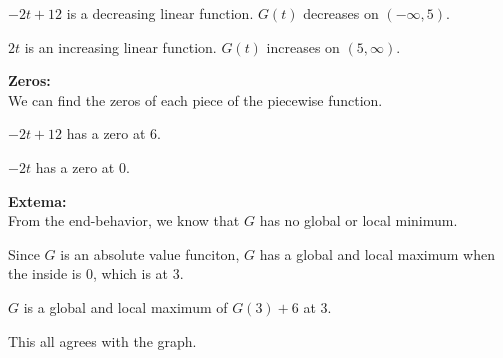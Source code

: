 \documentclass{ximera}
\begin{document}
\begin{exercise}
$-2 t + 12$ is a decreasing linear function.  $G(t)$ decreases on $(-\infty, 5)$.

$2 t$ is an increasing linear function.  $G(t)$ increases on $(5, \infty)$.





\textbf{\textcolor{blue!55!black}{Zeros:}}  \\


We can find the zeros of each piece of the piecewise function.




$-2 t + 12 $ has a zero at $6$.


$-2 t$ has a zero at $0$.





\textbf{\textcolor{blue!55!black}{Extema:}}  \\


From the end-behavior, we know that $G$ has no global or local minimum.


Since $G$ is an absolute value funciton, $G$ has a global and local maximum when the inside is $0$, which is at $3$.


$G$ is a global and local maximum of $G(3) + 6$ at $3$.












This all agrees with the graph.


\begin{image}
\end{image}















\end{exercise}
\end{document}
